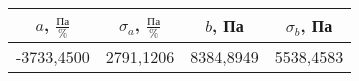 \begin{tabular}[t]{|c|c|c|c|}
\hline
$a$, $\frac{Па}{\%}$ & $\sigma_a$, $\frac{Па}{\%}$ & $b$, Па & $\sigma_b$, Па \\ 
\hline
-3733,4500 & 2791,1206 & 8384,8949 & 5538,4583 \\ 
\hline
\end{tabular}